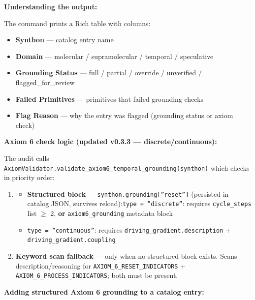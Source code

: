 \documentclass[12pt,a4paper]{article}
\begin{document}
\textbf{Understanding the output:}

The command prints a Rich table with columns:

\begin{itemize}
    \item \textbf{Synthon} --- catalog entry name
    \item \textbf{Domain} --- molecular / supramolecular / temporal / speculative
    \item \textbf{Grounding Status} --- full / partial / override / unverified / flagged\_for\_review
    \item \textbf{Failed Primitives} --- primitives that failed grounding checks
    \item \textbf{Flag Reason} --- why the entry was flagged (grounding status or axiom check)
\end{itemize}

\textbf{Axiom 6 check logic (updated v0.3.3 --- discrete/continuous):}

The audit calls \texttt{AxiomValidator.validate\_axiom6\_temporal\_grounding(synthon)} which checks in priority order:

\begin{enumerate}
    \item 
    \begin{itemize}
    \item \textbf{Structured block} --- \texttt{synthon.grounding{[}''reset''{]}} (persisted in catalog JSON, survives reload):\texttt{type = ''discrete''}: requires \texttt{cycle\_steps} list $\geq$ 2, \textbf{or} \texttt{axiom6\_grounding} metadata block
    \item \texttt{type = ''continuous''}: requires \texttt{driving\_gradient.description} + \texttt{driving\_gradient.coupling}
\end{itemize}

    \item \textbf{Keyword scan fallback} --- only when no structured block exists. Scans description/reasoning for \texttt{AXIOM\_6\_RESET\_INDICATORS} + \texttt{AXIOM\_6\_PROCESS\_INDICATORS}; both must be present.
\end{enumerate}

\textbf{Adding structured Axiom 6 grounding to a catalog entry:}
\end{document}
